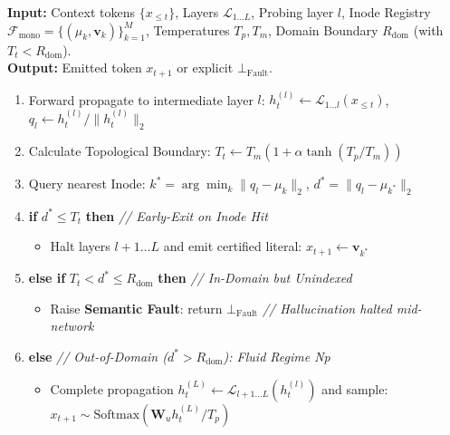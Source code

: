 \documentclass[10pt,twocolumn]{article}
\theoremstyle{definition}
\begin{document}
\begin{tcolorbox}[title={\small \textbf{Algorithm 1: Unified Forward Pass with Layer-$l$ Domain Gating and Early-Exit}}]
\footnotesize
\textbf{Input:} Context tokens $\{x_{\le t}\}$, Layers $\mathcal{L}_{1 \dots L}$, Probing layer $l$, Inode Registry $\mathcal{F}_{\mathrm{mono}} = \{(\mu_k, \mathbf{v}_k)\}_{k=1}^M$, Temperatures $T_p, T_m$, Domain Boundary $R_{\mathrm{dom}}$ (with $T_t < R_{\mathrm{dom}}$). \\
\textbf{Output:} Emitted token $x_{t+1}$ or explicit $\bot_{\mathrm{Fault}}$.
\begin{enumerate}[leftmargin=*, itemsep=1.0pt, topsep=1.0pt]
    \item Forward propagate to intermediate layer $l$: $h_t^{(l)} \leftarrow \mathcal{L}_{1 \dots l}(x_{\le t})$, $q_l \leftarrow h_t^{(l)} / \|h_t^{(l)}\|_2$
    \item Calculate Topological Boundary: $T_t \leftarrow T_m \left( 1 + \alpha \tanh(T_p / T_m) \right)$
    \item Query nearest Inode: $k^* = \arg\min_k \|q_l - \mu_k\|_2$, $d^* = \|q_l - \mu_{k^*}\|_2$
    \item \textbf{if} $d^* \le T_t$ \textbf{then} \hfill \textit{// Early-Exit on Inode Hit}
    \begin{itemize}[leftmargin=12pt, itemsep=0.5pt]
        \item Halt layers $l+1 \dots L$ and emit certified literal: $x_{t+1} \leftarrow \mathbf{v}_{k^*}$
    \end{itemize}
    \item \textbf{else if} $T_t < d^* \le R_{\mathrm{dom}}$ \textbf{then} \hfill \textit{// In-Domain but Unindexed}
    \begin{itemize}[leftmargin=12pt, itemsep=0.5pt]
        \item Raise \textbf{Semantic Fault}: return $\bot_{\mathrm{Fault}}$ \hfill \textit{// Hallucination halted mid-network}
    \end{itemize}
    \item \textbf{else} \hfill \textit{// Out-of-Domain ($d^* > R_{\mathrm{dom}}$): Fluid Regime Np}
    \begin{itemize}[leftmargin=12pt, itemsep=0.5pt]
        \item Complete propagation $h_t^{(L)} \leftarrow \mathcal{L}_{l+1 \dots L}(h_t^{(l)})$ and sample: $x_{t+1} \sim \mathrm{Softmax}(\mathbf{W}_u h_t^{(L)} / T_p)$
    \end{itemize}
\end{enumerate}
\end{tcolorbox}
\end{document}
